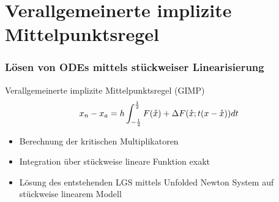 \section[Problemstellung]{Verallgemeinerte implizite Mittelpunktsregel}
\begin{frame}[<+->]
\frametitle{Lösen von ODEs mittels stückweiser Linearisierung}
 \begin{block}{Verallgemeinerte implizite Mittelpunktsregel (GIMP)}
 \[
  x_n - x_a = h\int_{-\frac{1}{2}}^{\frac{1}{2}} F(\mathring{x}) + \Delta F(\mathring{x}; t(x-\mathring{x}))dt
 \]
\end{block}
\begin{itemize}
 \item Berechnung der kritischen Multiplikatoren
 \item Integration über stückweise lineare Funktion exakt
 \item Lösung des entstehenden LGS mittels Unfolded Newton System auf stückweise linearem Modell
\end{itemize}

\end{frame}
